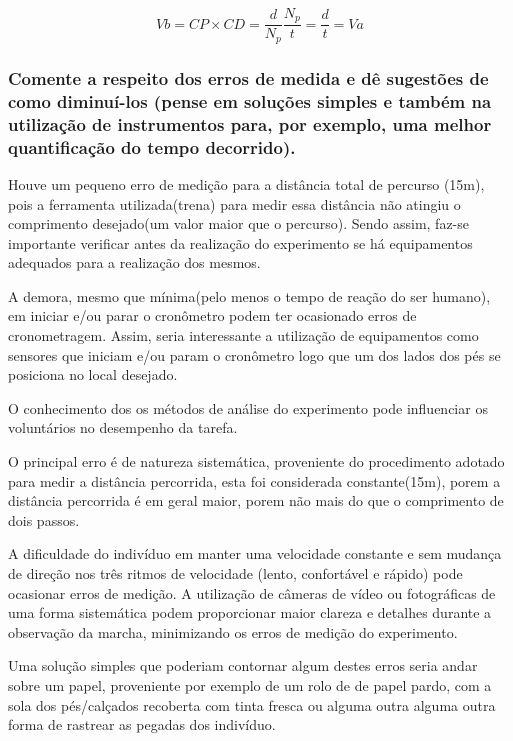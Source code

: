 \documentclass[a4paper,10pt]{article}
\begin{document}
\begin{equation}
   Vb = CP \times CD = \frac{d}{N_p} \frac{N_p}{t} = \frac{d}{t} = Va
\end{equation}

\subsubsection{Comente a respeito dos erros de medida e dê sugestões de como diminuí-los (pense em soluções simples e também na utilização de instrumentos para, por exemplo, uma melhor quantificação do tempo decorrido).}

Houve um pequeno erro de medição para a distância total de percurso (15m), pois a ferramenta utilizada(trena) para medir essa distância não atingiu o comprimento desejado(um valor maior que o percurso). Sendo assim, faz-se importante verificar antes da realização do experimento se há equipamentos adequados para a realização dos mesmos.

A demora, mesmo que mínima(pelo menos o tempo de reação do ser humano), em iniciar e/ou parar o cronômetro podem ter ocasionado erros de cronometragem. Assim, seria interessante a utilização de equipamentos como sensores que iniciam e/ou param o cronômetro logo que um dos lados dos pés se posiciona no local desejado.

O conhecimento dos os métodos de análise do experimento pode influenciar os voluntários no desempenho da tarefa. 

O principal erro é de natureza sistemática, proveniente do procedimento adotado para medir a distância percorrida, esta foi considerada constante(15m), porem a distância percorrida é em geral maior, porem não mais do que o comprimento de dois passos.

A dificuldade do indivíduo em manter uma velocidade constante e sem mudança de direção nos três ritmos de velocidade (lento, confortável e rápido) pode ocasionar erros de medição. A utilização de câmeras de vídeo ou fotográficas de uma forma sistemática podem proporcionar maior clareza e detalhes durante a observação da marcha, minimizando os erros de medição do experimento.

Uma solução simples que poderiam contornar algum destes erros seria andar sobre um papel, proveniente por exemplo de um rolo de de papel pardo, com a sola dos pés/calçados recoberta com tinta fresca ou alguma outra alguma outra forma de rastrear as pegadas dos indivíduo.
\end{document}
